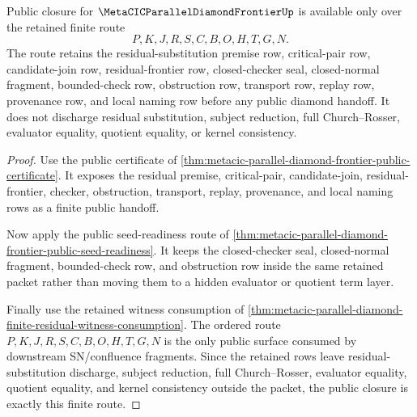 \begin{theorem}
\label{thm:metacic-parallel-diamond-frontier-public-closure}
Public closure for $\MetaCICParallelDiamondFrontierUp$ is available only over the retained finite route
$$
P,K,J,R,S,C,B,O,H,T,G,N.
$$
The route retains the residual-substitution premise row, critical-pair row, candidate-join row, residual-frontier row, closed-checker seal, closed-normal fragment, bounded-check row, obstruction row, transport row, replay row, provenance row, and local naming row before any public diamond handoff. It does not discharge residual substitution, subject reduction, full Church--Rosser, evaluator equality, quotient equality, or kernel consistency.
\end{theorem}
\begin{proof}
Use the public certificate of \autoref{thm:metacic-parallel-diamond-frontier-public-certificate}. It exposes the residual premise, critical-pair, candidate-join, residual-frontier, checker, obstruction, transport, replay, provenance, and local naming rows as a finite public handoff.

Now apply the public seed-readiness route of \autoref{thm:metacic-parallel-diamond-frontier-public-seed-readiness}. It keeps the closed-checker seal, closed-normal fragment, bounded-check row, and obstruction row inside the same retained packet rather than moving them to a hidden evaluator or quotient term layer.

Finally use the retained witness consumption of \autoref{thm:metacic-parallel-diamond-finite-residual-witness-consumption}. The ordered route $P,K,J,R,S,C,B,O,H,T,G,N$ is the only public surface consumed by downstream SN/confluence fragments. Since the retained rows leave residual-substitution discharge, subject reduction, full Church--Rosser, evaluator equality, quotient equality, and kernel consistency outside the packet, the public closure is exactly this finite route.
\end{proof}

